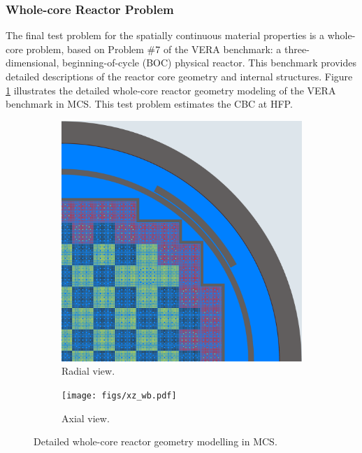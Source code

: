 \subsubsection{Whole-core Reactor Problem} \label{wc}

The final test problem for the spatially continuous material properties is a whole-core problem, based on Problem \#7 of the VERA benchmark: a three-dimensional, beginning-of-cycle (BOC) physical reactor. This benchmark provides detailed descriptions of the reactor core geometry and internal structures. Figure \ref{fig_4a} illustrates the detailed whole-core reactor geometry modeling of the VERA benchmark in MCS. This test problem estimates the CBC at HFP.

\begin{figure}
    \centering
    \begin{subfigure}[b]{0.55\textwidth}
        \centering
        \includegraphics[width=\textwidth]{figs/xy_wb.pdf}
        \caption{Radial view.}
    \end{subfigure}
    \hspace{10em}
    \begin{subfigure}[b]{0.36\textwidth}
        \centering
        \texttt{[image: figs/xz\_wb.pdf]}
        \caption{Axial view.}
    \end{subfigure}
    \caption{Detailed whole-core reactor geometry modelling in MCS.}
       \label{fig_4a}
\end{figure}

